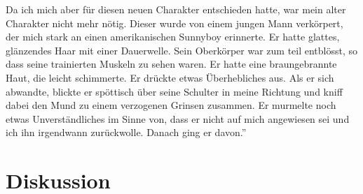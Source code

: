 {Da ich mich aber für diesen neuen Charakter entschieden hatte, war mein alter Charakter nicht mehr nötig. Dieser wurde von einem jungen Mann verkörpert, der mich stark an einen amerikanischen Sunnyboy erinnerte. Er hatte glattes, glänzendes Haar mit einer Dauerwelle. Sein Oberkörper war zum teil entblösst, so dass seine trainierten Muskeln zu sehen waren. Er hatte eine braungebrannte Haut, die leicht schimmerte. Er drückte etwas Überhebliches aus. Als er sich abwandte, blickte er spöttisch über seine Schulter in meine Richtung und kniff dabei den Mund zu einem verzogenen Grinsen zusammen. Er murmelte noch etwas Unverständliches im Sinne von, dass er nicht auf mich angewiesen sei und ich ihn irgendwann zurückwolle. Danach ging er davon.\textquotedblright}
\section*{Diskussion}\label{section.diskussion}




